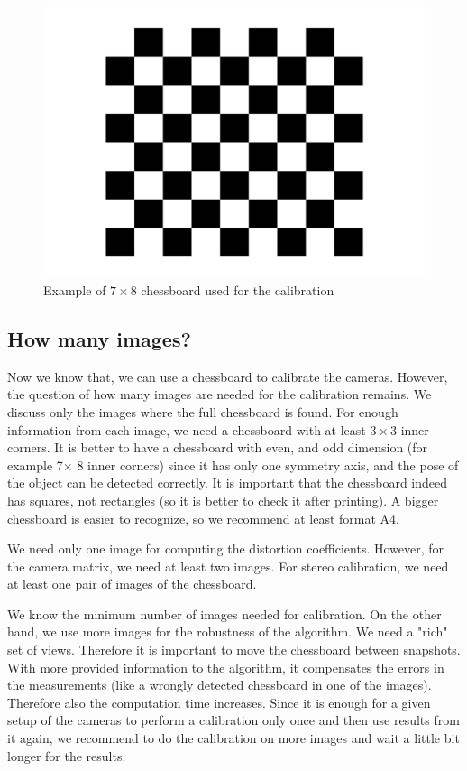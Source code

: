 \begin{figure}
	\centering
	\includegraphics[width=0.8\linewidth]{img/chessboard/7x8chessboard}
	\caption{Example of $7\times8$ chessboard used for the calibration}
	\label{fig:chessboard}
\end{figure}

\subsection{How many images?} 

Now we know that, we can use a chessboard to calibrate the cameras. However,
the question of how many images are needed for the calibration remains. We
discuss only the images where the full chessboard is found. For enough
information from each image, we need a chessboard with at least $3\times3$
inner corners. It is better to have a chessboard with even, and odd dimension
(for example 7$\times$ 8 inner corners) since it has only one symmetry axis,
and the pose of the object can be detected correctly. It is important that the
chessboard indeed has squares, not rectangles (so it is better to check it
after printing). A bigger chessboard is easier to recognize, so we recommend at
least format A4.

We need only one image for computing the distortion coefficients. However, for
the camera matrix, we need at least two images. For stereo calibration, we need at
least one pair of images of the chessboard.

We know the minimum number of images needed for calibration. On the other hand,
we use more images for the robustness of the algorithm. We need a "rich" set of
views. Therefore it is important to move the chessboard between snapshots. With
more provided information to the algorithm, it compensates the errors in the
measurements (like a wrongly detected chessboard in one of the images).
Therefore also the computation time increases. Since it is enough for a given
setup of the cameras to perform a calibration only once and then use results
from it again, we recommend to do the calibration on more images and wait a
little bit longer for the results. 
